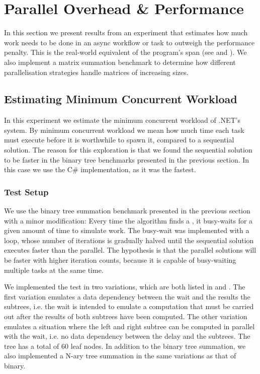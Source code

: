 \section{Parallel Overhead \& Performance}\label{sec:crit:work}
In this section we present results from an experiment that estimates how much work needs to be done in an async workflow or task to outweigh the performance penalty. This is the real-world equivalent of the program's span (see  and ). We also implement a matrix summation benchmark to determine how different parallelisation strategies handle matrices of increasing sizes.

\subsection{Estimating Minimum Concurrent Workload}
In this experiment we estimate the minimum concurrent workload of .NET's  system. By minimum concurrent workload we mean how much time each task must execute before it is worthwhile to spawn it, compared to a sequential solution. The reason for this exploration is that we found the sequential solution to be faster in the binary tree benchmarks presented in the previous section. In this case we use the C\# implementation, as it was the fastest.

\subsubsection{Test Setup}
We use the binary tree summation benchmark presented in the previous section with a minor modification: Every time the algorithm finds a , it busy-waits for a given amount of time to simulate work. The busy-wait was implemented with a loop, whose number of iterations is gradually halved until the sequential solution executes faster than the parallel. The hypothesis is that the parallel solutions will be faster with higher iteration counts, because it is capable of busy-waiting multiple tasks at the same time.

We implemented the test in two variations, which are both listed in  and . The first variation emulates a data dependency between the wait and the results the subtrees, i.e. the wait is intended to emulate a computation that must be carried out after the results of both subtrees have been computed. The other variation emulates a situation where the left and right subtree can be computed in parallel with the wait, i.e. no data dependency between the delay and the subtrees. The tree has a total of 60 leaf nodes. In addition to the binary tree summation, we also implemented a N-ary tree summation in the same variations as that of binary.

